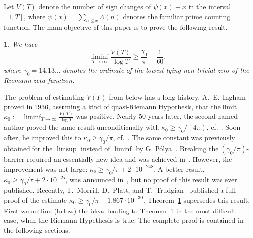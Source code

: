 \documentclass[oneside,english]{amsart}
\numberwithin{equation}{section}
\numberwithin{figure}{section}
\theoremstyle{plain}
\newtheorem{thm}{\protect\theoremname}
\theoremstyle{plain}
\theoremstyle{plain}
\theoremstyle{definition}
\providecommand{\theoremname}{Theorem}
\begin{document}
Let $V(T)$ denote the number of sign changes of $\psi(x)-x$ in the
interval $[1,T]$, where $\psi(x)=\sum_{n\leq x}\Lambda(n)$ denotes
the familiar prime counting function. The main objective of this paper
is to prove the following result. 
\begin{thm}
\label{thm:Main-Theorem}We have 
\[
\liminf_{T\to\infty}\frac{V(T)}{\log T}\geq\frac{\gamma_{0}}{\pi}+\frac{1}{60},
\]
 where $\gamma_{0}=14.13\ldots$ denotes the ordinate of the lowest-lying
non-trivial zero of the Riemann zeta-function. 
\end{thm}
The problem of estimating $V(T)$ from below has a long history. A.~E.~Ingham~\cite{Ingham}
proved in 1936, assuming a kind of quasi-Riemann Hypothesis, that
the limit $\kappa_{0}:=\liminf_{T\to\infty}\frac{V(T)}{\log T}$ was
positive. Nearly 50 years later, the second named author proved the
same result unconditionally with $\kappa_{0}\geq\gamma_{0}/(4\pi)$,
cf.~\cite{Kaczorowski1984}. Soon after, he improved this to $\kappa_{0}\geq\gamma_{0}/\pi$,
cf.~\cite{Kaczorowski1985}. The same constant was previously obtained
for the $\limsup$ instead of $\liminf$ by G. P\'{o}lya~\cite{Polya1969}.
Breaking the $(\gamma_{0}/\pi)$-barrier required an essentially new
idea and was achieved in~\cite{Kaczorowski1991}. However, the improvement
was not large: $\kappa_{0}\geq\gamma_{0}/\pi+2\cdot10^{-248}$. A
better result, $\kappa_{0}\geq\gamma_{0}/\pi+2\cdot10^{-25}$, was
announced in~\cite{Kaczorowski1996}, but no proof of this result
was ever published. Recently, T.~Morrill, D.~Platt, and T.~Trudgian~\cite{MorrillPlattTrudgian2022}
published a full proof of the estimate $\kappa_{0}\geq\gamma_{0}/\pi+1.867\cdot10^{-30}$.
Theorem~\ref{thm:Main-Theorem} supersedes this result. First we
outline (below) the ideas leading to Theorem~\ref{thm:Main-Theorem}
in the most difficult case, when the Riemann Hypothesis is true. The
complete proof is contained in the following sections.
\end{document}
